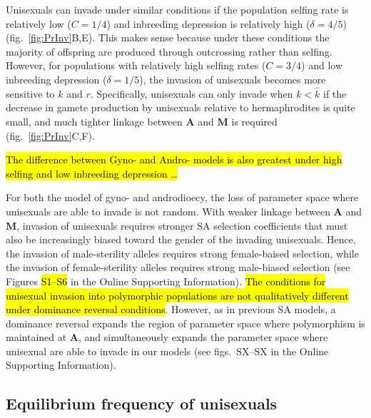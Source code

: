 \documentclass[9pt,twocolumn,twoside,lineno]{gsajnl}
\begin{document}
Unisexuals can invade under similar conditions if the population selfing rate is relatively low ($C = 1/4$) and inbreeding depression is relatively high ($\delta = 4/5$) (fig.~\ref{fig:PrInv}B,E). This makes sense because under these conditions the majority of offspring are produced through outcrossing rather than selfing. However, for populations with relatively high selfing rates ($C = 3/4$) and low inbreeding depression ($\delta = 1/5$), the invasion of unisexuals becomes more sensitive to $k$ and $r$. Specifically, unisexuals can only invade when $k < \hat{k}$ if the decrease in gamete production by unisexuals relative to hermaphrodites is quite small, and much tighter linkage between $\mathbf{A}$ and $\mathbf{M}$ is required (fig.~\ref{fig:PrInv}C,F). 

\hl{The difference between Gyno- and Andro- models is also greatest under high selfing and low inbreeding depression \ldots}

For both the model of gyno- and androdioecy, the loss of parameter space where unisexuals are able to invade is not random. With weaker linkage between $\mathbf{A}$ and $\mathbf{M}$, invasion of unisexuals requires stronger SA selection coefficients that must also be increasingly biased toward the gender of the invading unisexuals. Hence, the invasion of male-sterility alleles requires strong female-baised selection, while the invasion of female-sterility alleles requires strong male-biased selection (see Figures \hl{S1--S6} in the Online Supporting Information). \hl{The conditions for unisexual invasion into polymorphic populations are not qualitatively different under dominance reversal conditions}. However, as in previous SA models, a dominance reversal expands the region of parameter space where polymorphism is maintained at $\mathbf{A}$, and simultaneously expands the parameter space where unisexual are able to invade in our models (see figs.~SX--SX in the Online Supporting Information).


\subsection{Equilibrium frequency of unisexuals}
\end{document}
